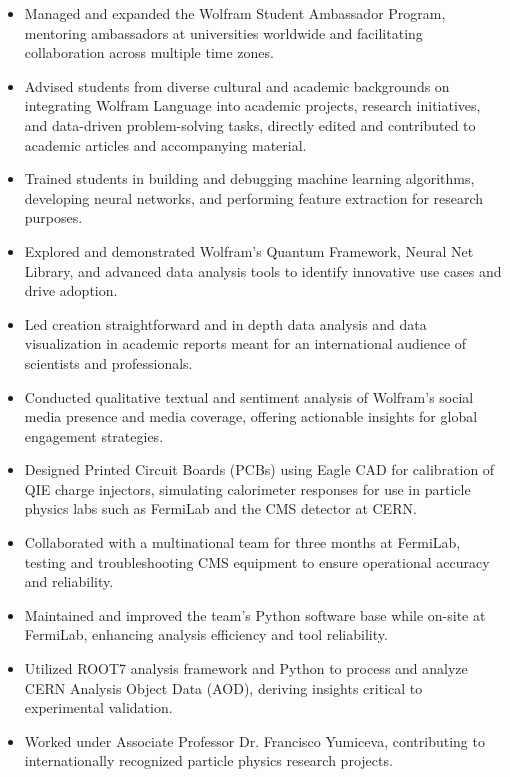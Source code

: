 \documentclass[10pt,a4paper,ragged2e,withhyper]{altacv}
\begin{document}
\begin{paracol}{2}
\begin{itemize}
    \item Managed and expanded the Wolfram Student Ambassador Program, mentoring ambassadors at universities worldwide and facilitating collaboration across multiple time zones.
    \item Advised students from diverse cultural and academic backgrounds on integrating Wolfram Language into academic projects, research initiatives, and data-driven problem-solving tasks, directly edited and contributed to academic articles and accompanying material.
    \item Trained students in building and debugging machine learning algorithms, developing neural networks, and performing feature extraction for research purposes.
    \item Explored and demonstrated Wolfram’s Quantum Framework, Neural Net Library, and advanced data analysis tools to identify innovative use cases and drive adoption.
    \item Led creation straightforward and in depth data analysis and data visualization in academic reports meant for an international audience of scientists and professionals.
    \item Conducted qualitative textual and sentiment analysis of Wolfram’s social media presence and media coverage, offering actionable insights for global engagement strategies. 
\end{itemize}
\newpage
{}
\begin{itemize}
    \item Designed Printed Circuit Boards (PCBs) using Eagle CAD for calibration of QIE charge injectors, simulating calorimeter responses for use in particle physics labs such as FermiLab and the CMS detector at CERN.
    \item Collaborated with a multinational team for three months at FermiLab, testing and troubleshooting CMS equipment to ensure operational accuracy and reliability.
    \item Maintained and improved the team’s Python software base while on-site at FermiLab, enhancing analysis efficiency and tool reliability.
    \item Utilized ROOT7 analysis framework and Python to process and analyze CERN Analysis Object Data (AOD), deriving insights critical to experimental validation.
    \item Worked under Associate Professor Dr. Francisco Yumiceva, contributing to internationally recognized particle physics research projects.


\end{itemize}
\end{paracol}
\end{document}
